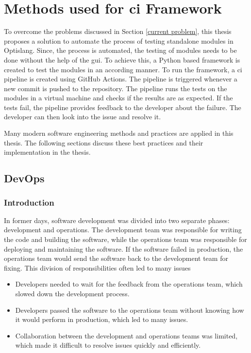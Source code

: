 \chapter{Methods used for \acrshort{ci} Framework}
To overcome the problems discussed in Section \ref{current problem}, this thesis proposes a solution to automate the process of testing standalone modules
in Optislang. Since, the process is automated, the testing of modules needs to be done without the help of the \acrshort{gui}. To achieve this, a Python based 
framework is created to test the modules in an according manner. To run the framework, a \acrshort{ci} pipeline is created using GitHub Actions. The pipeline 
is triggered whenever a new commit is pushed to the repository. The pipeline runs the tests on the modules in a virtual machine and checks if the results are as expected. If the tests 
fail, the pipeline provides feedback to the developer about the failure. The developer can then look into the issue and resolve it. 

Many modern software engineering methods and practices are applied in this thesis. The following sections discuss these best practices and their implementation in the thesis. 
\section{DevOps}
\subsection{Introduction}
In former days, software development was divided into two separate phases: development and operations. The development team was responsible for writing the code and 
building the software, while the operations team was responsible for deploying and maintaining the software. If the software failed in production, the operations 
team would send the software back to the development team for fixing. This division of responsibilities often led to many issues
\begin{itemize}
    \item Developers needed to wait for the feedback from the operations team, which slowed down the development process.
    \item Developers passed the software to the operations team without knowing how it would perform in production, which led to many issues.
    \item Collaboration between the development and operations teams was limited, which made it difficult to resolve issues quickly and efficiently.
\end{itemize}

